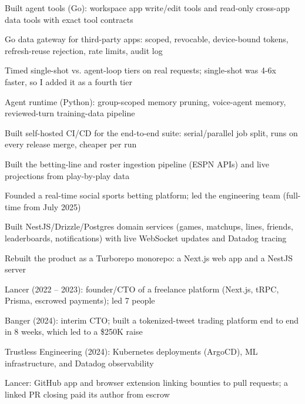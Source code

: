\documentclass[print]{jack-resume}
\begin{document}
\begin{tightemize}
    \item Built agent tools (Go): workspace app write/edit tools and read-only cross-app data tools with exact tool contracts
    \item Go data gateway for third-party apps: scoped, revocable, device-bound tokens, refresh-reuse rejection, rate limits, audit log
    \item Timed single-shot vs. agent-loop tiers on real requests; single-shot was 4-6x faster, so I added it as a fourth tier
    \item Agent runtime (Python): group-scoped memory pruning, voice-agent memory, reviewed-turn training-data pipeline
    \item Built self-hosted CI/CD for the end-to-end suite: serial/parallel job split, runs on every release merge, cheaper per run
\end{tightemize}
\sectionsep

\begin{tightemize}
    \item Built the betting-line and roster ingestion pipeline (ESPN APIs) and live projections from play-by-play data
    \item Founded a real-time social sports betting platform; led the engineering team (full-time from July 2025)
    \item Built NestJS/Drizzle/Postgres domain services (games, matchups, lines, friends, leaderboards, notifications) with live WebSocket updates and Datadog tracing
    \item Rebuilt the product as a Turborepo monorepo: a Next.js web app and a NestJS server
\end{tightemize}
\sectionsep

\begin{tightemize}
    \item Lancer (2022 -- 2023): founder/CTO of a freelance platform (Next.js, tRPC, Prisma, escrowed payments); led 7 people
    \item Banger (2024): interim CTO; built a tokenized-tweet trading platform end to end in 8 weeks, which led to a \$250K raise
    \item Trustless Engineering (2024): Kubernetes deployments (ArgoCD), ML infrastructure, and Datadog observability
    \item Lancer: GitHub app and browser extension linking bounties to pull requests; a linked PR closing paid its author from escrow
\end{tightemize}
\sectionsep
\end{document}
